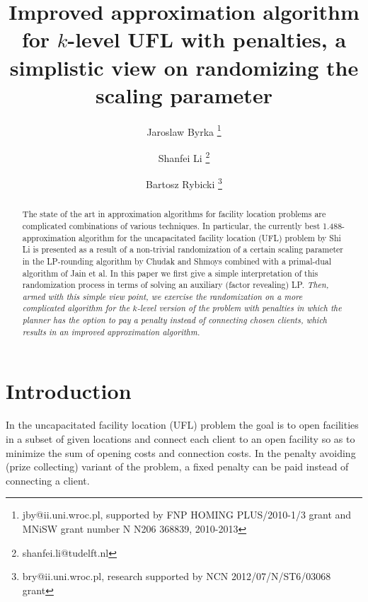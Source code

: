 \documentclass{llncs}
\newcommand{\va}[1]{{\color{black}\sl  #1}}
\begin{document}
\title{Improved approximation algorithm for $k$-level UFL with penalties, a simplistic view on randomizing the scaling parameter}

\author{Jaroslaw Byrka \thanks{jby@ii.uni.wroc.pl, supported by FNP HOMING PLUS/2010-1/3 grant and MNiSW grant number N N206 368839, 2010-2013 } \and Shanfei Li \thanks{shanfei.li@tudelft.nl}\and Bartosz Rybicki \thanks{bry@ii.uni.wroc.pl, research supported by NCN 2012/07/N/ST6/03068 grant}}


\maketitle

\begin{abstract}
  The state of the art in approximation algorithms for facility location problems are complicated combinations of various techniques.
  In particular, the currently best 1.488-approximation algorithm for the uncapacitated facility location (UFL) problem by Shi Li is presented as a result of a non-trivial randomization of a certain scaling parameter
  in the LP-rounding algorithm by Chudak and Shmoys combined with a primal-dual algorithm of Jain et al.
  In this paper we first give a simple interpretation of this randomization process in terms of solving an auxiliary (factor revealing) LP.
  \va{Then, armed with this simple view point, we exercise the randomization on a more complicated algorithm for the $k$-level version of the problem with penalties in which the planner has the option to pay a penalty instead of connecting chosen clients, which results in an improved approximation algorithm.}
\end{abstract}

\section{Introduction}

In the uncapacitated facility location (UFL) problem the goal is to open facilities in a subset of given locations and connect each client to an open facility so as to minimize the sum of opening costs and connection costs. In the penalty avoiding (prize collecting) variant of the problem, a fixed penalty can be paid instead of connecting a client.
\end{document}
